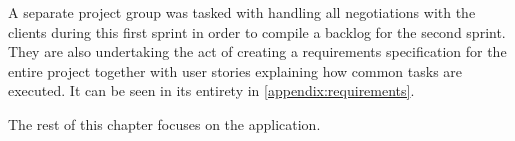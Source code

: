 A separate project group was tasked with handling all negotiations with the clients during this first sprint in order to compile a backlog for the second sprint.
They are also undertaking the act of creating a requirements specification for the entire project together with user stories explaining how common tasks are executed.
It can be seen in its entirety in \cref{appendix:requirements}.

The rest of this chapter focuses on the \launcher application.